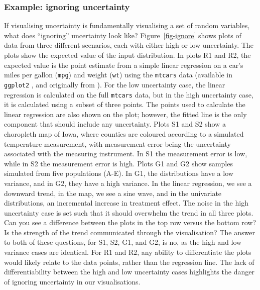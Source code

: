 \documentclass[]{ar-1col-S2O}
\begin{document}
\subsubsection{Example: ignoring
uncertainty}\label{example-ignoring-uncertainty}

If visualising uncertainty is fundamentally visualising a set of random
variables, what does ``ignoring'' uncertainty look like?
Figure~\ref{fig-ignore} shows plots of data from three different
scenarios, each with either high or low uncertainty. The plots show the
expected value of the input distribution. In plots R1 and R2, the
expected value is the point estimate from a simple linear regression on
a car's miles per gallon (\texttt{mpg}) and weight (\texttt{wt}) using
the \texttt{mtcars} data (available in \texttt{ggplot2} \citep{ggplot2},
and originally from \citet{mtcars}). For the low uncertainty case, the
linear regression is calculated on the full \texttt{mtcars} data, but in
the high uncertainty case, it is calculated using a subset of three
points. The points used to calculate the linear regression are also
shown on the plot; however, the fitted line is the only component that
should include any uncertainty. Plots S1 and S2 show a choropleth map of
Iowa, where counties are coloured according to a simulated temperature
measurement, with measurement error being the uncertainty associated
with the measuring instrument. In S1 the measurement error is low, while
in S2 the measurement error is high. Plots G1 and G2 show samples
simulated from five populations (A-E). In G1, the distributions have a
low variance, and in G2, they have a high variance. In the linear
regression, we see a downward trend, in the map, we see a sine wave, and
in the univariate distributions, an incremental increase in treatment
effect. The noise in the high uncertainty case is set such that it
should overwhelm the trend in all three plots. Can you see a difference
between the plots in the top row versus the bottom row? Is the strength
of the trend communicated through the visualisation? The answer to both
of these questions, for S1, S2, G1, and G2, is no, as the high and low
variance cases are identical. For R1 and R2, any ability to
differentiate the plots would likely relate to the data points, rather
than the regression line. The lack of differentiability between the high
and low uncertainty cases highlights the danger of ignoring uncertainty
in our visualisations.
\end{document}
